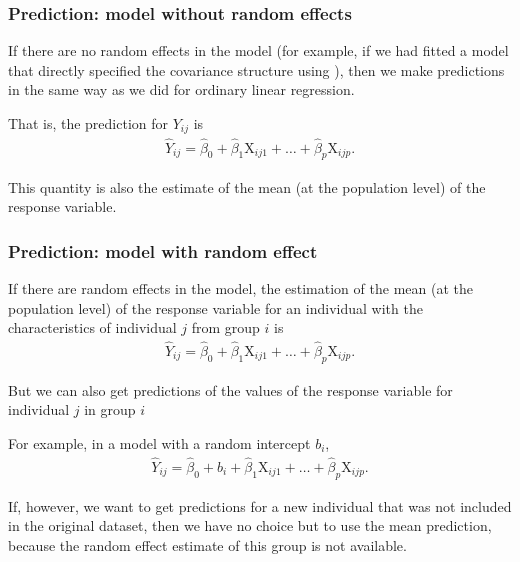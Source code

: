 \documentclass{beamer}
\begin{document}
\begin{frame}
\frametitle{Prediction: model \textbf{without} random effects}
\bi
\item \alert{If there are no random effects in the model} (for example, if we had fitted a model that directly specified the covariance structure using ), then we make predictions in the same way as we did for ordinary linear regression. 
\item That is, the prediction for $Y_{ij}$ is
\begin{align*}
\hat{Y}_{ij}=\hat{\beta}_0 + \hat{\beta}_1\mathrm{X}_{ij1} + \ldots + \hat{\beta}_p\mathrm{X}_{ijp}.
\end{align*}
\item This quantity is also the estimate of the \alert{mean} (at the \alert{population level}) of the response variable.
\ei
\end{frame}

\begin{frame}
\frametitle{Prediction: model \textbf{with} random effect}
\bi
\item If there are random effects in the model, the estimation of the \alert{mean} (at the \alert{population level}) of the response variable for an individual with the characteristics of individual $j$ from group $i$ is
\begin{align*}
\hat{Y}_{ij}=\hat{\beta}_0 + \hat{\beta}_1\mathrm{X}_{ij1} + \ldots + \hat{\beta}_p\mathrm{X}_{ijp}.
\end{align*}


\item But we can also get predictions of the
values of the response variable for individual $j$ in group $i$
\item For example, in a model with a random intercept $b_{i}$,
 \begin{align*}
\hat{Y}_{ij}=\hat{\beta}_0 +\hat{b}_{i} + \hat{\beta}_1\mathrm{X}_{ij1} + \ldots + \hat{\beta}_p\mathrm{X}_{ijp}. 
\end{align*}

\item If, however, we want to get predictions for a \alert{new}
individual that was not included in the original dataset, then we have no choice but to use the mean prediction, because the random effect estimate of this group is not available.
\ei
\end{frame}
\end{document}
